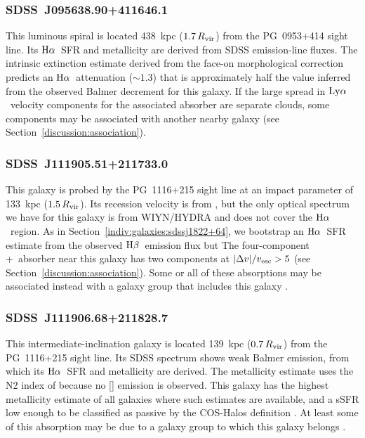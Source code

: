 \documentclass[twocolumn,twocolappendix,tighten,times]{aastex6}
\newcommand{\HI}{\ion{H}{1}}
\newcommand{\OIII}{\ion{O}{3}}
\newcommand{\OVI}{\ion{O}{6}}
\newcommand{\Ha}{\ensuremath{{\rm H}\alpha}}
\newcommand{\Hb}{\ensuremath{{\rm H}\beta}}
\newcommand{\lya}{\ensuremath{{\rm Ly}\alpha}}
\begin{document}
\subsubsection{SDSS~J095638.90+411646.1}
\label{indiv:galaxies:sdssj0956+41}

This luminous spiral is located 438~kpc ($1.7\,R_{\rm vir}$) from the PG~0953+414
sight line. Its \Ha\ SFR and metallicity are derived from 
SDSS emission-line fluxes. The intrinsic extinction estimate derived from the 
face-on morphological correction predicts an \Ha\ attenuation ($\sim1.3$) that is 
approximately half the value inferred from the observed Balmer decrement for this 
galaxy. If the large spread in \lya\ velocity components for the associated 
absorber are separate clouds, some components may be associated with another 
nearby galaxy (see Section~\ref{discussion:association}).


\subsubsection{SDSS~J111905.51+211733.0}
\label{indiv:galaxies:sdssj1119+21a}

This galaxy is probed by the PG~1116+215 sight line at an impact parameter of 
133~kpc ($1.5\,R_{\rm vir}$). Its recession velocity is from \citet{prochaska11b}, 
but the only optical spectrum we have for this galaxy is from WIYN/HYDRA and 
does not cover the \Ha\ region. As in 
Section~\ref{indiv:galaxies:sdssj1822+64}, we bootstrap an \Ha\ SFR 
estimate from the observed \Hb\ emission flux but 
The four-component \HI+\OVI\ absorber near this galaxy has two components at 
$|\Delta v|/v_{\rm esc}>5$ (see Section~\ref{discussion:association}). Some or all 
of these absorptions may be associated instead with a galaxy group that includes 
this galaxy \citep{stocke14}.


\subsubsection{SDSS~J111906.68+211828.7}
\label{indiv:galaxies:sdssj1119+21b}

This intermediate-inclination galaxy is located 139~kpc ($0.7\,R_{\rm vir}$) 
from the PG~1116+215 sight line. Its SDSS spectrum shows weak Balmer emission, 
from which its \Ha\ SFR and metallicity are derived. The 
metallicity estimate uses the N2 index of \citet{pettini04} because no 
[\OIII] emission is observed. This galaxy has the highest metallicity 
estimate of all galaxies where such estimates are available, and a sSFR low 
enough to be classified as passive by the COS-Halos definition 
\citep[$<10^{-11}~{\rm yr}^{-1}$;][]{tumlinson11}. At least some of this absorption
may be due to a galaxy group to which this galaxy belongs \citep{stocke14}.
\end{document}
